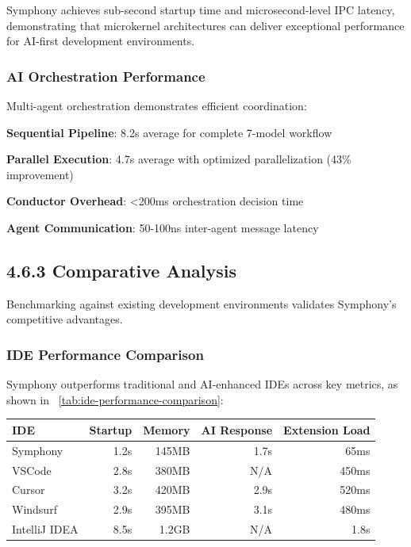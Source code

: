 \begin{infobox}[title=Performance Achievement]
Symphony achieves sub-second startup time and microsecond-level IPC latency, demonstrating that microkernel architectures can deliver exceptional performance for AI-first development environments.
\end{infobox}

\subsubsection*{AI Orchestration Performance}

Multi-agent orchestration demonstrates efficient coordination:

\begin{expandedlist}
    \item \textbf{Sequential Pipeline}: 8.2s average for complete 7-model workflow
    \item \textbf{Parallel Execution}: 4.7s average with optimized parallelization (43\% improvement)
    \item \textbf{Conductor Overhead}: <200ms orchestration decision time
    \item \textbf{Agent Communication}: 50-100ns inter-agent message latency
\end{expandedlist}

\subsection*{4.6.3 Comparative Analysis}
\label{subsec:comparative-analysis}

Benchmarking against existing development environments validates Symphony's competitive advantages.

\subsubsection*{IDE Performance Comparison}

Symphony outperforms traditional and AI-enhanced IDEs across key metrics, as shown in ~\ref{tab:ide-performance-comparison}:

\begin{center}
\begin{tabular}{@{}lrrrr@{}}
\toprule
\textbf{IDE} & \textbf{Startup} & \textbf{Memory} & \textbf{AI Response} & \textbf{Extension Load} \\
\midrule
Symphony & 1.2s & 145MB & 1.7s & 65ms \\
VSCode & 2.8s & 380MB & N/A & 450ms \\
Cursor & 3.2s & 420MB & 2.9s & 520ms \\
Windsurf & 2.9s & 395MB & 3.1s & 480ms \\
IntelliJ IDEA & 8.5s & 1.2GB & N/A & 1.8s \\
\bottomrule
\end{tabular}
\label{tab:ide-performance-comparison}
\end{center}

